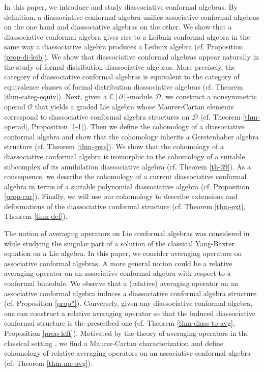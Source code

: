 \documentclass[a4paper,reqno,10pt]{amsart}
\theoremstyle{plain}
\theoremstyle{definition}
\theoremstyle{remark}
\newcommand{\C}{\mathbb{C}}
\newcommand{\D}{\mathcal{D}}
\newcommand{\p}{\partial}
\begin{document}
\medskip

In this paper, we introduce and study diassociative conformal algebras. By definition, a diassociative conformal algebra unifies associative conformal algebras on the one hand and diassociative algebras on the other. We show that a diassociative conformal algebra gives rise to a Leibniz conformal algebra in the same way a diassociative algebra produces a Leibniz algebra (cf. Proposition \ref{prop-di-leib}). We show that diassociative conformal algebras appear naturally in the study of formal distribution diassociative algebras. More precisely, the category of diassociative conformal algebras is equivalent to the category of equivalence classes of formal distribution diassociative algebras (cf. Theorem \ref{thm-categ-equiv}). Next, given a $\C[\p]$-module $\D$, we construct a nonsymmetric operad $\mathcal{O}$ that yields a graded Lie algebra whose Maurer-Cartan elements correspond to diassociative conformal algebra structures on $\D$ (cf. Theorem \ref{thm-operad}, Proposition \ref{1-1}). Then we define the cohomology of a diassociative conformal algebra and show that the cohomology inherits a Gerstenhaber algebra structure (cf. Theorem \ref{thm-gers}). We show that the cohomology of a diassociative conformal algebra is isomorphic to the cohomology of a suitable subcomplex of its annihilation diassociative algebra (cf. Theorem \ref{th-39}). As a consequence, we describe the cohomology of a current diassociative conformal algebra in terms of a suitable polynomial diassociative algebra (cf. Proposition \ref{prop-cur}). Finally, we will use our cohomology to describe extensions and deformations of the diassociative conformal structure (cf. Theorem \ref{thm-ext}, Theorem \ref{thm-def}).

\medskip

The notion of averaging operators on Lie conformal algebras was considered in \cite{Koles} while studying the singular part of a solution of the classical Yang-Baxter equation on a Lie algebra. In this paper, we consider averaging operators on associative conformal algebras. A more general notion could be a relative averaging operator on an associative conformal algebra with respect to a conformal bimodule. We observe that a (relative) averaging operator on an associative conformal algebra induces a diassociative conformal algebra structure (cf. Proposition \ref{prop*}). Conversely, given any diassociative conformal algebra, one can construct a relative averaging operator so that the induced diassociative conformal structure is the prescribed one (cf. Theorem \ref{thm-diass-to-avg}, Proposition \ref{prop-left}). Motivated by the theory of averaging operators in the classical setting \cite{das-cont}, we find a Maurer-Cartan characterization and define cohomology of relative averaging operators on an associative conformal algebra (cf. Theorem \ref{thm-mc-avg}). 
\end{document}
